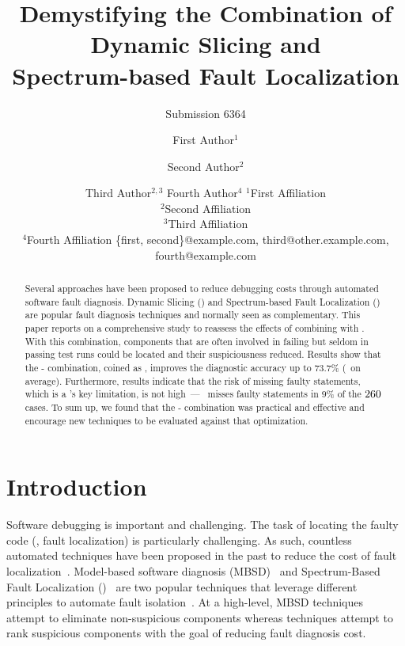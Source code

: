 \documentclass{article}
\title{Demystifying the Combination of Dynamic Slicing and \\ Spectrum-based Fault
Localization}
\author{
    Submission 6364
}
\author{
First Author$^1$
\and
Second Author$^2$\and
Third Author$^{2,3}$\And
Fourth Author$^4$
\affiliations
$^1$First Affiliation\\
$^2$Second Affiliation\\
$^3$Third Affiliation\\
$^4$Fourth Affiliation
\emails
\{first, second\}@example.com,
third@other.example.com,
fourth@example.com
}
\begin{document}
\maketitle

\begin{abstract}
Several approaches have been proposed to reduce debugging costs through
automated software fault diagnosis.  Dynamic Slicing (\ds{}) and Spectrum-based
Fault Localization (\sfl{}) are popular fault diagnosis techniques and normally
seen as complementary. This paper reports on a comprehensive
study to reassess the effects of combining \ds{} with \sfl{}.  With this
combination, components that are often involved in failing but seldom in passing
test runs could be located and their suspiciousness reduced. Results show that
the \ds{}-\sfl{} combination, coined as \comb, improves the diagnostic
accuracy up to $73.7\%$ (\avgImprov\ on average). Furthermore, results indicate
that the risk of missing faulty statements, which is a \ds{}'s key limitation,
is not high~---~\ds{} misses faulty statements in $9\%$
of the $\numFaults{}$ cases. To sum up, we found that the \ds{}-\sfl{} combination
was practical and effective and encourage new \sfl{} techniques to be evaluated
against that optimization.
\end{abstract}

\section{Introduction}

Software debugging is important and challenging. The task of locating
the faulty code (\ie{}, fault localization) is particularly
challenging. As such, countless automated techniques have been
proposed in the past to reduce the cost of fault
localization~\cite{7390282}. Model-based software diagnosis
(MBSD)~\cite{REITER198757,DEKLEER200325} and Spectrum-Based Fault
Localization (\sfl{})~\cite{DBLP:journals/stvr/HarroldRSWY00} are two
popular techniques that leverage different principles to automate
fault isolation~\cite{DBLP:conf/sac/AbreuGZG08}.  At a high-level,
MBSD
techniques~\cite{wotawa2002model,Mayer:2008:EMM:1642931.1642950,mayer2008prioritising,Perez:2018:LQR:3304889.3304927,Ko:2008:DRA:1368088.1368130}
attempt to eliminate non-suspicious components whereas \sfl{}
techniques attempt to rank suspicious components with the goal of
reducing fault diagnosis cost.
\end{document}
